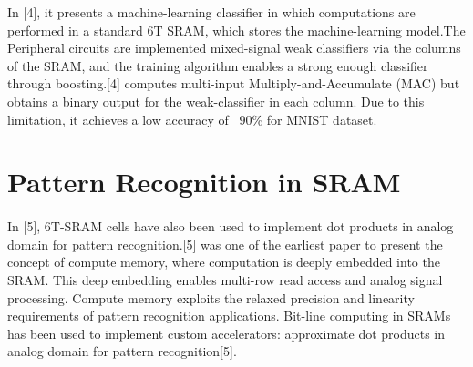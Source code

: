 In [4], it presents a machine-learning classifier in which computations are performed in a standard 6T SRAM, which stores the machine-learning model.The Peripheral circuits are implemented mixed-signal weak classifiers via the columns of the SRAM, and the training algorithm enables a strong enough classifier through boosting.[4] computes multi-input Multiply-and-Accumulate (MAC) but obtains a binary output for the weak-classifier in each column. Due to this limitation, it achieves a low accuracy of ~90\% for MNIST dataset.

\section{Pattern Recognition in SRAM}
\paragraph{}

In [5], 6T-SRAM cells have also been used to implement dot products in analog domain for pattern recognition.[5] was one of the earliest paper to present the concept of compute memory, where computation is deeply embedded into the SRAM. This deep embedding enables multi-row read access and analog signal processing. Compute memory exploits the relaxed precision and linearity requirements of pattern recognition applications. Bit-line computing in SRAMs has been used to implement custom accelerators: approximate dot products in analog domain for pattern recognition[5]. 
